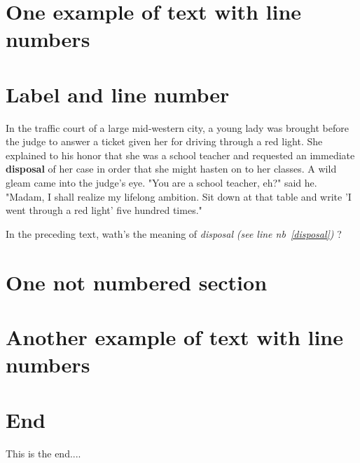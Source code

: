 \documentclass[12pt]{article}
\newenvironment{numberIt}[1][1]{%
		\hrulefill
		\par
		\modulolinenumbers[#1]%
		\begin{linenumbers}%
	}{%
		\end{linenumbers}%
		\resetlinenumber%
		\hrulefill%
	}
\newcommand{\labelIt}[1]{%
		\textbf{#1}\linelabel{#1}%
	}
\begin{document}
\section{One example of text with line numbers}

\begin{numberIt}
	\lipsum[1]
\end{numberIt}


\section{Label and line number}

\begin{numberIt}
	In the traffic court of a large mid-western city, a young
	lady was brought before the judge to answer a ticket given
	her for driving through a red light. She explained to his
	honor that she was a school teacher and requested an immediate
	\labelIt{disposal} of her case in order that she might hasten
	on to her classes. A wild gleam came into the judge's eye.
	"You are a school teacher, eh?" said he. "Madam, I shall
	realize my lifelong ambition. Sit down at that table and
	write 'I went through a red light' five hundred times."
\end{numberIt}

In the preceding text, wath's the meaning of \emph{disposal} \emph{(see line nb~\ref{disposal})} ?


\section{One not numbered section}

\lipsum[1]


\section{Another example of text with line numbers}

\begin{numberIt}[5]
	\lipsum[1]
\end{numberIt}


\section{End}
This is the end....
\end{document}
